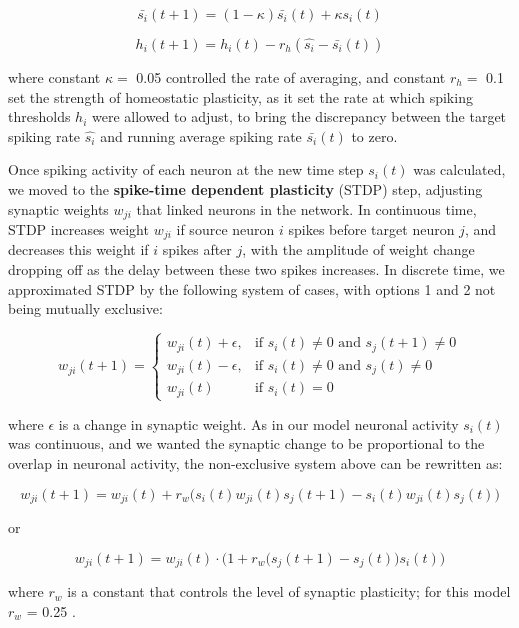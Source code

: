 \documentclass{article}
\begin{document}
\[ \bar{s_i}(t+1) = (1-\kappa)\bar{s_i}(t) + \kappa s_i(t) \]

\[ h_i(t+1) = h_i(t) - r_h(\hat{s_i} - \bar{s_i}(t)) \]

where constant $\kappa=$ 0.05 controlled the rate of averaging, and constant $r_h=$ 0.1 set the strength of homeostatic plasticity, as it set the rate at which spiking thresholds $h_i$ were allowed to adjust, to bring the discrepancy between the target spiking rate $\hat{s_i}$ and running average spiking rate $\bar{s_i}(t)$ to zero.

Once spiking activity of each neuron at the new time step $s_i(t)$ was calculated, we moved to the \textbf{spike-time dependent plasticity} (STDP) step, adjusting synaptic weights $w_{ji}$ that linked neurons in the network. In continuous time, STDP increases weight $w_{ji}$ if source neuron $i$ spikes before target neuron $j$, and decreases this weight if $i$ spikes after $j$, with the amplitude of weight change dropping off as the delay between these two spikes increases. In discrete time, we approximated STDP by the following system of cases, with options 1 and 2 not being mutually exclusive:



\[ w_{ji}(t+1) = \left \{ \begin{array}{lll} w_{ji}(t)+\epsilon, & \text{if } s_i(t)\neq 0 \text{ and } s_j(t+1)\neq 0 \\ w_{ji}(t)-\epsilon, & \text{if } s_i(t)\neq 0 \text{ and } s_j(t)\neq 0 \\ w_{ji}(t) & \text{if } s_i(t)=0\end{array} \right. \]

where $\epsilon$ is a change in synaptic weight. As in our model neuronal activity $s_i(t)$ was continuous, and we wanted the synaptic change to be proportional to the overlap in neuronal activity, the non-exclusive system above can be rewritten as:

\[ w_{ji}(t+1) = w_{ji}(t) + r_w \big(s_i(t)w_{ji}(t)s_j(t+1) - s_i(t)w_{ji}(t)s_j(t)\big) \]

or

\[ w_{ji}(t+1) = w_{ji}(t)\cdot\Big(1+r_w\big(s_j(t+1)-s_j(t)\big)s_i(t)\Big) \]

where $r_w$ is a constant that controls the level of synaptic plasticity; for this model $r_w$ = 0.25 .
\end{document}
